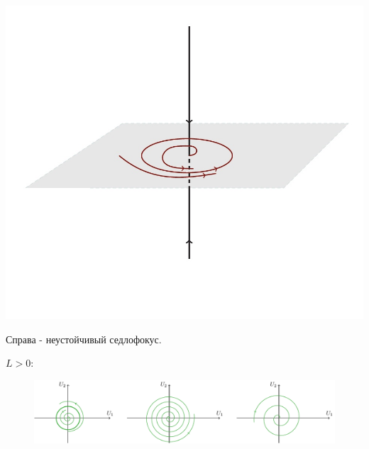 \begin{center}
\begin{minipage}{0.3\linewidth}
        \vspace{-50pt}
        \label{fig:1}
    \end{minipage}
\hfill     
    \begin{minipage}{0.3\linewidth}
        \includegraphics[width=\linewidth]{fig/55_3.jpg} 
        \vspace{-50pt}
        \label{fig:1}
    \end{minipage}    
\end{center}

Справа - неустойчивый седлофокус.

$L>0:$
\begin{figure}[H]
	\centering
	\includegraphics[width=1\linewidth]{fig/fig58.pdf}   
\end{figure}


